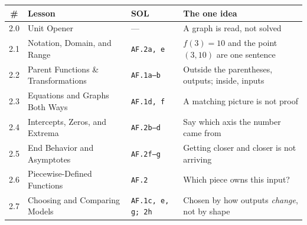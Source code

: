 \boxguard[14]
\begin{tocbox}
\small
\renewcommand{\arraystretch}{1.32}
\begin{tabularx}{\linewidth}{@{} c >{\raggedright\arraybackslash}p{5.0cm} l X @{}}
\rowcolor{mist}
\textbf{\#} & \textbf{Lesson} & \textbf{SOL} & \textbf{The one idea} \\
\midrule
2.0 & Unit Opener                       & ---                       & A graph is read, not solved \\
2.1 & Notation, Domain, and Range       & \texttt{AF.2a, e}         & $f(3)=10$ and the point $(3,10)$ are one sentence \\
2.2 & Parent Functions \& Transformations & \texttt{AF.1a--b}       & Outside the parentheses, outputs; inside, inputs \\
2.3 & Equations and Graphs Both Ways    & \texttt{AF.1d, f}         & A matching picture is not proof \\
2.4 & Intercepts, Zeros, and Extrema    & \texttt{AF.2b--d}         & Say which axis the number came from \\
2.5 & End Behavior and Asymptotes       & \texttt{AF.2f--g}         & Getting closer and closer is not arriving \\
2.6 & Piecewise-Defined Functions       & \texttt{AF.2}             & Which piece owns this input? \\
2.7 & Choosing and Comparing Models     & \texttt{AF.1c, e, g; 2h}  & Chosen by how outputs \emph{change}, not by shape \\
\end{tabularx}
\end{tocbox}

\vspace{0.12in}


